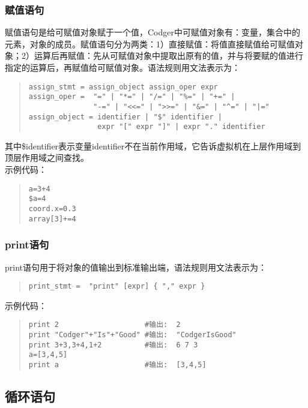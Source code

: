 \subsubsection{赋值语句}
赋值语句是给可赋值对象赋于一个值，Codger中可赋值对象有：变量，集合中的元素，对象的成员。赋值语句分为两类：1）直接赋值：将值直接赋值给可赋值对象；2）运算后再赋值：先从可赋值对象中提取出原有的值，并与将要赋的值进行指定的运算后，再赋值给可赋值对象。语法规则用文法表示为：
\begin{quote}
\begin{verbatim}
assign_stmt = assign_object assign_oper expr 
assign_oper =  "=" | "*=" | "/=" | "%=" | "+=" |
               "-=" | "<<=" | ">>=" | "&=" | "^=" | "|="
assign_object = identifier | "$" identifier |
                expr "[" expr "]" | expr "." identifier 
\end{verbatim}
\end{quote}
其中\$identifier表示变量identifier不在当前作用域，它告诉虚拟机在上层作用域到顶层作用域之间查找。\\
示例代码：
\begin{quote}
\begin{verbatim}
a=3+4     
$a=4      
coord.x=0.3
array[3]+=4
\end{verbatim}
\end{quote}
\subsubsection{print语句}
print语句用于将对象的值输出到标准输出端，语法规则用文法表示为：
\begin{quote}
\begin{verbatim}
print_stmt =  "print" [expr] { "," expr }
\end{verbatim}
\end{quote}
示例代码：
\begin{quote}
\begin{verbatim}
print 2                    #输出:  2
print "Codger"+"Is"+"Good" #输出:  "CodgerIsGood"
print 3+3,3+4,1+2          #输出:  6 7 3
a=[3,4,5]
print a                    #输出:  [3,4,5]
\end{verbatim}
\end{quote}



\subsection{循环语句}
